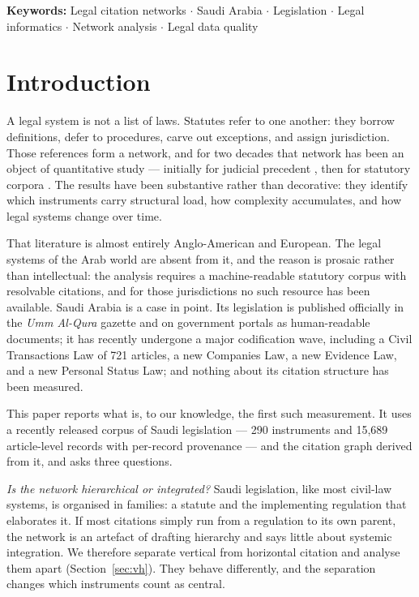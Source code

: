 \documentclass[sn-basic]{sn-jnl}%
\newcommand{\usingsnstyle}{}%
\begin{document}
\ifdefined\usingsnstyle
{}
\else
\vspace{1em}\noindent\textbf{Keywords:} Legal citation networks $\cdot$ Saudi
Arabia $\cdot$ Legislation $\cdot$ Legal informatics $\cdot$ Network analysis
$\cdot$ Legal data quality
\vspace{1em}
\fi

\section{Introduction}
\label{sec:intro}

A legal system is not a list of laws. Statutes refer to one another:
they borrow definitions, defer to procedures, carve out exceptions, and
assign jurisdiction. Those references form a network, and for two decades
that network has been an object of quantitative study --- initially for
judicial precedent \citep{fowler2007network}, then for statutory corpora
\citep{katz2014complexity, coupette2021measuring}. The results have been
substantive rather than decorative: they identify which instruments carry
structural load, how complexity accumulates, and how legal systems change
over time.

That literature is almost entirely Anglo-American and European. The legal
systems of the Arab world are absent from it, and the reason is prosaic
rather than intellectual: the analysis requires a machine-readable statutory
corpus with resolvable citations, and for those jurisdictions no such
resource has been available. Saudi Arabia is a case in point. Its
legislation is published officially in the \emph{Umm Al-Qura} gazette and on
government portals as human-readable documents; it has recently undergone a
major codification wave, including a Civil Transactions Law of 721 articles,
a new Companies Law, a new Evidence Law, and a new Personal Status Law; and
nothing about its citation structure has been measured.

This paper reports what is, to our knowledge, the first such measurement. It
uses a recently released
corpus of Saudi legislation --- 290 instruments and 15{,}689 article-level
records with per-record provenance \citep{almohammedi2026corpus} --- and the
citation graph derived from it, and asks three questions.

\emph{Is the network hierarchical or integrated?} Saudi legislation, like
most civil-law systems, is organised in families: a statute and the
implementing regulation that elaborates it. If most citations simply run
from a regulation to its own parent, the network is an artefact of drafting
hierarchy and says little about systemic integration. We therefore separate
vertical from horizontal citation and analyse them apart
(Section~\ref{sec:vh}). They behave differently, and the separation changes
which instruments count as central.
\end{document}
